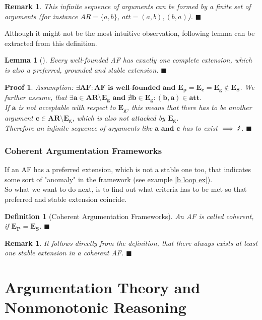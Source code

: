 \documentclass[12pt]{report}
\numberwithin{figure}{chapter}
\theoremstyle{break}
\newtheorem{defn}{Definition}[chapter]
\newtheorem{lem}{Lemma}[chapter]
\newtheorem*{prf}{Proof}
\newtheorem*{rmrk}{Remark}
\newtheorem*{frmrk}{Remark}
\newenvironment{mydefn}{\begin{defn}}{$\blacksquare$ \end{defn}}
\newenvironment{mylem}{\begin{lem}}{$\blacksquare$ \end{lem}}
\newenvironment{myprf}{\begin{prf}}{$\blacksquare$ \end{prf}}
\newenvironment{myrmrk}{\begin{rmrk}}{$\blacksquare$ \end{rmrk}}
\newenvironment{myfrmrk}{\begin{frmrk}}{$\blacksquare$ \end{frmrk}}
\begin{document}
\begin{myfrmrk}
This infinite sequence of arguments can be formed by a finite set of arguments (for instance $AR=\{a,b\}$, $att={(a,b),(b,a)}$).
\end{myfrmrk}

Although it might not be the most intuitive observation, following lemma can be extracted from this definition.
\begin{mylem}[\cite{Dung}]
Every well-founded AF has exactly one complete extension, which is also a preferred, grounded and stable extension.
\end{mylem}

\begin{myprf}
Assumption: $\bm{\exists AF: \text{AF is well-founded and } E_{p}=E_{c}=E_{g} \notin E_{S}}$.
We further assume, that $\bm{\exists a \in AR \text{\textbackslash} E_{g} \text{ and } \nexists b \in E_{g}:(b,a) \in att}$.\\
\bigskip
If $\bm{a}$ is not acceptable with respect to $\bm{E_{g}}$, this means that there has to be another argument $\bm{c \in AR \text{\textbackslash} E_{g}}$, 
which is also not attacked by $\bm{E_{g}}$. \\ Therefore an infinite sequence of arguments like $\bm{a \text{ and }c}$ has to exist $\implies \text{\Lightning}$.
\end{myprf}

\subsection{Coherent Argumentation Frameworks}
If an AF has a preferred extension, which is not a stable one too, that indicates some sort of "anomaly" in the framework (see example \ref{b loop ex}).\\
So what we want to do next, is to find out what criteria has to be met so that preferred and stable extension coincide.

\begin{mydefn}[Coherent Argumentation Frameworks]
An AF is called coherent, if $\bm{E_{P} = E_{S}}$.
\end{mydefn}

\begin{myrmrk}
It follows directly from the definition, that there always exists at least one stable extension in a coherent AF.
\end{myrmrk}

\chapter{Argumentation Theory and Nonmonotonic Reasoning}
\end{document}
